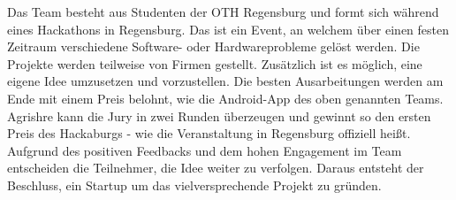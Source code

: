 Das Team besteht aus Studenten der OTH Regensburg und formt sich während eines Hackathons in Regensburg. Das ist ein Event, an welchem über einen festen Zeitraum verschiedene Software- oder Hardwareprobleme gelöst werden. Die Projekte werden teilweise von Firmen gestellt. Zusätzlich ist es möglich, eine eigene Idee umzusetzen und vorzustellen. Die besten Ausarbeitungen werden am Ende mit einem Preis belohnt, wie die Android-App des oben genannten Teams. Agrishre kann die Jury in zwei Runden überzeugen und gewinnt so den ersten Preis des Hackaburgs - wie die Veranstaltung in Regensburg offiziell heißt. Aufgrund des positiven Feedbacks und dem hohen Engagement im Team entscheiden die Teilnehmer, die Idee weiter zu verfolgen. Daraus entsteht der Beschluss, ein Startup um das vielversprechende Projekt zu gründen.

